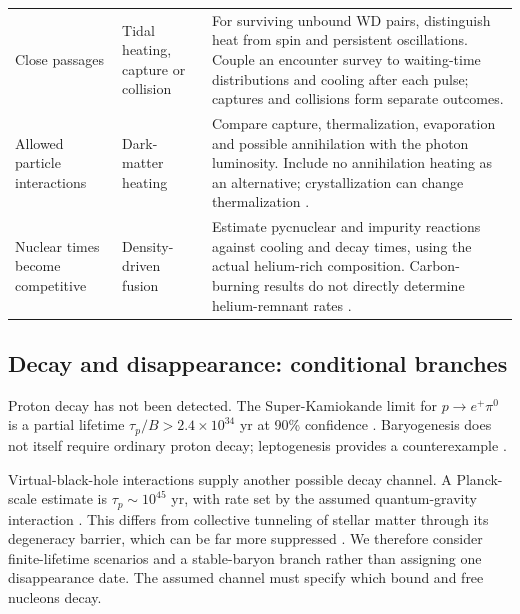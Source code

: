 {\begin{tabular}{@{}>{\raggedright\arraybackslash}p{}
 >{\raggedright\arraybackslash}p{}
 >{\raggedright\arraybackslash}p{}@{}}
Close passages & Tidal heating, capture or collision &
For surviving unbound WD pairs, distinguish heat from spin and persistent
oscillations. Couple an encounter survey to waiting-time distributions and
cooling after each pulse; captures and collisions form separate outcomes. \\[4pt]
Allowed particle interactions & Dark-matter heating &
Compare capture, thermalization, evaporation and possible annihilation with
the photon luminosity. Include no annihilation heating as an alternative;
crystallization can change thermalization \cite{bell24}. \\[4pt]
Nuclear times become competitive & Density-driven fusion &
Estimate pycnuclear and impurity reactions against cooling and decay times,
using the actual helium-rich composition. Carbon-burning results do not
directly determine helium-remnant rates \cite{gasques05}. \\
\bottomrule
\end{tabular}}

\clearpage
\subsection{Decay and disappearance: conditional branches}
Proton decay has not been detected. The Super-Kamiokande limit for
$p\rightarrow e^+\pi^0$ is a partial lifetime
$\tau_p/B>2.4\times10^{34}$ yr at 90\% confidence \cite{takenaka20}.
Baryogenesis does not itself require ordinary proton decay; leptogenesis
provides a counterexample \cite{fukugita86}.

Virtual-black-hole interactions supply another possible decay channel. A
Planck-scale estimate is $\tau_p\sim10^{45}$ yr, with rate set by the assumed
quantum-gravity interaction \cite{adams01}. This differs from collective
tunneling of stellar matter through its degeneracy barrier, which can be far
more suppressed \cite{adams98}. We therefore consider finite-lifetime
scenarios and a stable-baryon branch rather than assigning one disappearance
date. The assumed channel must specify which bound and free nucleons decay.

